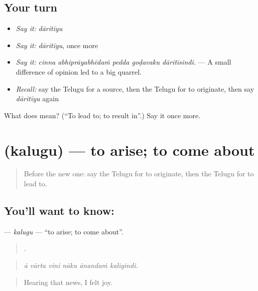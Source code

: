 \subsection*{Your turn}
\begin{itemize}
\raggedright
  \item \emph{Say it:} \emph{dāritīyu}
  \item \emph{Say it:} \emph{dāritīyu}, once more
  \item \emph{Say it:} \emph{cinna abhiprāyabhēdaṁ pedda goḍavaku dāritīsindi.} — A small difference of opinion led to a big quarrel.
  \item \emph{Recall:} say the Telugu for a source, then the Telugu for to originate, then say \emph{dāritīyu} again
\end{itemize}

\begin{tcolorbox}[breakable,colback=teal!4,colframe=teal!35!black,title={Before you move on}]
What does  mean? (\textquotedblleft{}To lead to; to result in\textquotedblright{}.) Say it once more.
\end{tcolorbox}
\section[\texorpdfstring{\te{కలుగు} (kalugu)}{కలుగు (kalugu)}]{ (kalugu) — to arise; to come about}

\label{lesson:TE-C392-kalugu}



\begin{quote}
Before the new one: say the Telugu for to originate, then the Telugu for to lead to.
\end{quote}

\subsection*{You'll want to know: }
\textbf{} — \emph{kalugu} — \textquotedblleft{}to arise; to come about\textquotedblright{}.

\begin{quote}
     .
\end{quote}

\begin{quote}
\emph{ā vārta vini nāku ānandaṁ kaligindi.}
\end{quote}

\begin{quote}
Hearing that news, I felt joy.
\end{quote}

